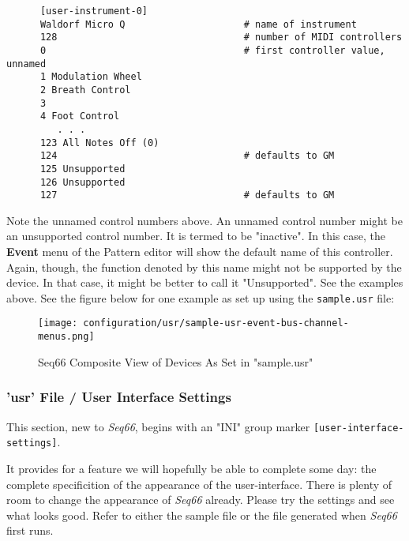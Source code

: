    \begin{verbatim}
      [user-instrument-0]
      Waldorf Micro Q                     # name of instrument
      128                                 # number of MIDI controllers
      0                                   # first controller value, unnamed
      1 Modulation Wheel
      2 Breath Control
      3 
      4 Foot Control
         . . .
      123 All Notes Off (0)
      124                                 # defaults to GM
      125 Unsupported
      126 Unsupported
      127                                 # defaults to GM
   \end{verbatim}

   Note the unnamed control numbers above.
   An unnamed control number might be an unsupported control number.
   It is termed to be "inactive".  In this case, the \textbf{Event} menu of
   the Pattern editor will show the default name of this controller.
   Again, though, the function denoted by this name might not be supported by
   the device.  In that case, it might be better to call it "Unsupported".
   See the examples above.  See the figure below for one example as set up using
   the \texttt{sample.usr} file:


\begin{figure}[H]
   \centering 
   \texttt{[image: configuration/usr/sample-usr-event-bus-channel-menus.png]}
   \caption{Seq66 Composite View of Devices As Set in "sample.usr"}
   \label{fig:sample_usr_event_bus_channel_menus}
\end{figure}

\subsubsection{'usr' File / User Interface Settings}
\label{subsubsec:usr_file_user_interface_settings}

   This section, new to \textsl{Seq66}, begins with an
   "INI" group marker \texttt{[user-interface-settings]}.

   It provides for a feature we will hopefully be able to complete some day:
   the complete specificition of the appearance of the user-interface.
   There is plenty of room to change the appearance of
   \textsl{Seq66} already.
   Please try the settings and see what looks good.
   Refer to either the sample file or the file generated when \textsl{Seq66}
   first runs.

